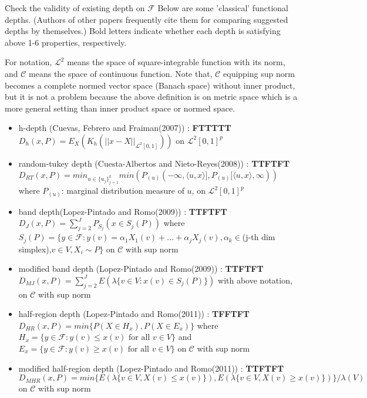 \documentclass[aspectratio=169,ignorenonframetext,9pt]{beamer}
\theoremstyle{plain}
\theoremstyle{definition}
\begin{document}
\begin{frame}{Check the validity of existing depth on $\mathcal{F}$}
Below are some 'classical' functional depths.
(Authors of other papers frequently cite them
for comparing suggested depths by themselves.)
Bold letters indicate whether each depth is satisfying above 1-6 properties, respectively.

For notation, $\mathcal{L}^2$ means the space of square-integrable function with its norm,
and $\mathcal{C}$ means the space of continuous function.
Note that, $\mathcal{C}$ equipping sup norm becomes a complete normed vector space (Banach space)
without inner product, but it is not a problem because the above definition is on metric space
which is a more general setting than inner product space or normed space.

\begin{itemize}
    \item h-depth (Cuevas, Febrero and Fraiman(2007)) : \textbf{FTTTTT}\\
    $D_h(x,P)=E_X(K_h(||x-X||_{\mathcal{L}^2[0,1]}))$ on $\mathcal{L}^2[0,1]^p$ 
    \item random-tukey depth (Cuesta-Albertos and Nieto-Reyes(2008)) : \textbf{TTFTFT}\\
    $D_{RT}(x,P)=min_{u\in\{u_j\}_{j=1}^k}min(P_{(u)}(-\infty,\langle u,x \rangle], P_{(u)}[\langle u,x \rangle,\infty))$ \\
    where $P_{(u)}$: marginal distribution measure of $u$, on $\mathcal{L}^2[0,1]^p$
    \item band depth(Lopez-Pintado and Romo(2009)) : \textbf{TTFTFT}\\
    $D_J(x,P)=\sum_{j=2}^J P_{S_j}(x\in S_j(P))$ where $S_j(P)=\{y\in\mathcal{F} : y(v)=\alpha_1X_1(v)+...+\alpha_jX_j(v), \alpha_k\in$(j-th dim simplex),$ v\in V, X_i\sim P\}$
    on $\mathcal{C}$ with sup norm 
    \item modified band depth (Lopez-Pintado and Romo(2009)) : \textbf{TTFTFT}\\
    $D_{MJ}(x,P)=\sum_{j=2}^J E(\lambda \{v\in V : x(v)\in S_j(P)\})$ with above notation,
    on $\mathcal{C}$ with sup norm 
    \item half-region depth (Lopez-Pintado and Romo(2011)) : \textbf{TFFTFT}\\
    $D_{HR}(x,P)=min\{P(X\in H_x), P(X\in E_x)\}$ where $H_x=\{y\in\mathcal{F} : y(v)\leq x(v) \text{ for all } v\in V\}$ and 
    $E_x=\{y\in\mathcal{F} : y(v)\geq x(v) \text{ for all } v\in V\}$ on $\mathcal{C}$ with sup norm 
    \item modified half-region depth (Lopez-Pintado and Romo(2011)) : \textbf{TTFTFT}\\
    $D_{MHR}(x,P)=min\{E(\lambda\{v\in V, X(v)\leq x(v)\}), E(\lambda\{v\in V, X(v)\geq x(v)\})\}/\lambda(V)$
    on $\mathcal{C}$ with sup norm
\end{itemize}

\end{frame}
\end{document}
